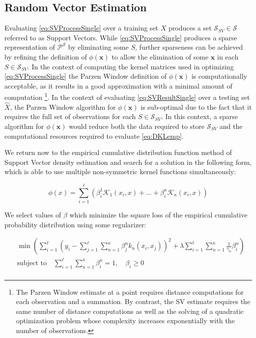 \documentclass[10pt]{article}
\begin{document}
\subsection{ Random Vector Estimation }
 
Evaluating \ref{eq:SVProcessSingle} over a training set \( X \) produces a set \( \mathcal{S}_{SV} \in \mathcal{S} \) referred to as Support Vectors.  While \ref{eq:SVProcessSingle} produces a sparse representation of \( \mathcal{P}^\mathcal{S} \) by eliminating some \( S \), further sparseness can be achieved by refining the definition of \( \phi(\mathbf{x}) \) to allow the elimination of some \( \mathbf{x} \) in each \( S \in \mathcal{S}_{SV} \).  In the context of computing the kernel matrices used in optimizing \ref{eq:SVProcessSingle} the Parzen Window definition of \( \phi(\mathbf{x}) \) is computationally acceptable, as it results in a good approximation with a minimal amount of computation \footnote{ The Parzen Window estimate at a point requires distance computations for each observation and a summation.  By contrast, the SV estimate requires the same number of distance computations as well as the solving of a quadratic optimization problem whose complexity increases exponentially with the number of observations. }.  In the context of evaluating \ref{eq:SVResultSingle} over a testing set \( \hat{X} \), the Parzen Window algorithm for \( \phi(\mathbf{x}) \) is sub-optimal due to the fact that it requires the full set of observations for each \( S \in \mathcal{S}_{SV} \).  In this context, a sparse algorithm for \( \phi(\mathbf{x}) \) would reduce both the data required to store \( \mathcal{S}_{SV} \) and the computational resources required to evaluate \ref{eq:DKLemp}.

We return now to the empirical cumulative distribution function method of Support Vector density estimation and search for a solution in the following form, which is able to use multiple non-symmetric kernel functions simultaneously:

\begin{equation} \label{eq:SVDensity}
\phi(x) = \sum_{i=1}^\ell \left( \beta_i^1 \mathcal{K}_1(x_i,x) + ... + \beta_i^\kappa \mathcal{K}_\kappa( x_i,x) \right)
\end{equation}

We select values of \( \beta \) which minimize the square loss of the empirical cumulative probability distribution using some regularizer:

\begin{align}
&\min \left( \sum_{i=1}^\ell \left( y_i - \sum_{j=1}^\ell \sum_{n=1}^\kappa \beta_j^n k_n(x_i, x_j) \right)^2 + \lambda \sum_{i=1}^\ell \sum_{n=1}^\kappa \frac{1}{\gamma_n} \beta_i^n \right) \\
&\text{subject to} \quad \sum_{i=1}^\ell \sum_{n=1}^\kappa \beta_i^n = 1, \quad \beta_i \ge 0 \\
\end{align}
\end{document}
